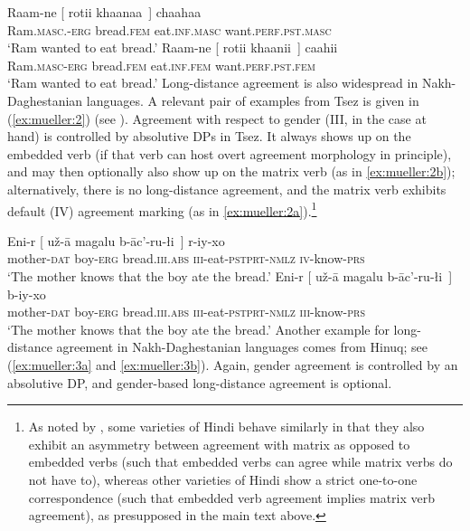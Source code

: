 \documentclass[output=paper
,modfonts
,nonflat]{langsci/langscibook}
\begin{document}
	\ea\label{ex:mueller:1} 
	\ea \label{ex:mueller:1a}
	\gll  Raam-ne [\sub{$\alpha$} rotii khaanaa~] chaahaa \\ 
	Ram.{\scshape masc}.-{\scshape erg} {} bread.{\scshape fem} eat.{\scshape inf}.{\scshape masc} want.{\scshape perf.pst.masc} \\ 
	\glt  `Ram wanted to eat bread.' 
	\ex \label{ex:mueller:1b}
	\gll Raam-ne [\sub{$\alpha$} rotii khaanii~] caahii \\ 
	Ram.{\scshape masc}-{\scshape erg} {} bread.{\scshape fem} eat.{\scshape inf}.{\scshape fem} want.{\scshape perf.pst.fem} \\ 
	\glt `Ram wanted to eat bread.' 
	\z 
	\z
	Long-distance agreement is also widespread in Nakh-Daghestanian
	languages. A relevant pair of examples from Tsez is given in (\ref{ex:mueller:2}) (see \citealt{PolinskyPotsdam:01}). Agreement with respect to gender
	(III, in the case at hand) is controlled by
	absolutive DPs in Tsez. It always shows up on the embedded verb (if
	that verb can host overt agreement morphology in principle), and may
	then optionally also show up on the matrix verb (as in \ref{ex:mueller:2b});
	alternatively, there is no long-distance agreement, and the matrix
	verb exhibits default (IV) agreement marking (as in \ref{ex:mueller:2a}).\footnote{As
		noted by \citet{Bhatt:05}, some varieties of Hindi behave similarly
		in that they also exhibit an asymmetry between agreement with matrix
		as opposed to embedded verbs (such that embedded verbs can agree
		while matrix verbs do not have to), whereas other varieties of Hindi show a
		strict one-to-one correspondence (such that embedded verb agreement
		implies matrix verb agreement), as presupposed in the main text above.}

	\ea\label{ex:mueller:2} 
	\ea \label{ex:mueller:2a}
	\gll     Eni-r [\sub{$\alpha$} u\v{z}-\={a} magalu b-\={a}c'-ru-\l i~] r-iy-xo \\
	mother-{\scshape dat} {} boy-{\scshape erg} bread.{\scshape iii.abs} {\scshape iii}-eat-{\scshape pstprt-nmlz} {\scshape iv}-know-{\scshape prs} \\
	\glt     `The mother knows that the boy ate the bread.'\newpage
	\ex \label{ex:mueller:2b}
	\gll     Eni-r [\sub{$\alpha$} u\v{z}-\={a} \label{2-b}magalu b-\={a}c'-ru-\l i~] b-iy-xo \\
	mother-{\scshape dat} {} boy-{\scshape erg} bread.{\scshape iii.abs} {\scshape iii}-eat-{\scshape pstprt-nmlz} {\scshape iii}-know-{\scshape prs} \\
	\glt `The mother knows that the boy ate the bread.' 
	\z
	\z
	Another example for long-distance agreement in Nakh-Daghestanian
	languages comes from Hinuq; see (\ref{ex:mueller:3a} and \ref{ex:mueller:3b}). 
	Again, gender agreement is controlled by an
	absolutive DP, and gender-based long-distance agreement is optional.
	
\end{document}
